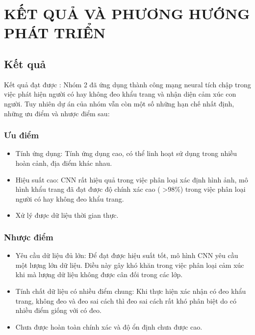 
\chapter{KẾT QUẢ VÀ PHƯƠNG HƯỚNG PHÁT TRIỂN} 

\label{Chapter4}

\section{Kết quả}

Kết quả đạt được : Nhóm 2 đã ứng dụng thành công mạng neural tích chập trong việc phát hiện người có hay không đeo khẩu trang và nhận diện cảm xúc con người. Tuy nhiên dự án của nhóm vẫn còn một số những hạn chế nhất định, những ưu điểm và nhược điểm sau:

\subsection{Ưu điểm}

\begin{itemize}
	\item Tính ứng dụng: Tính ứng dụng cao, có thể linh hoạt sử dụng trong nhiều hoàn cảnh, địa điểm khác nhau. 
	
	\item Hiệu suất cao: CNN rất hiệu quả trong việc phân loại xác định hình ảnh, mô hình khẩu trang đã đạt được độ chính xác cao ( >98\%) trong việc phân loại người có hay không đeo khẩu trang.
	
	\item Xử lý được dữ liệu thời gian thực. 
\end{itemize}

\subsection{Nhược điểm}

\begin{itemize}
	\item Yêu cầu dữ liệu đủ lớn: Để đạt được hiệu suất tốt, mô hình CNN yêu cầu một lượng lớn dữ liệu. Điều này gây khó khăn trong việc phân loại cảm xúc khi mà lượng dữ liệu không được cân đối trong các lớp. 
	
	\item Tính chất dữ liệu có nhiều điểm chung: Khi thực hiện xác nhận có đeo khẩu trang, không đeo và đeo sai cách thì đeo sai cách rất khó phân biệt do có nhiều điểm giống với có đeo.
	
	\item Chưa được hoàn toàn chính xác và độ ổn định chưa được cao. 
\end{itemize}

